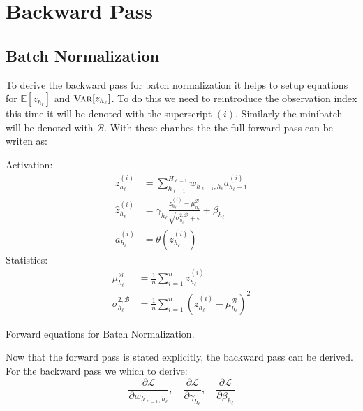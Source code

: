 \chapter{Backward Pass}

\section{Batch Normalization}
\label{appendix:backward-pass:batch-norm}

To derive the backward pass for batch normalization it helps to setup equations for $\mathbb{E}[z_{h_\ell}]$ and $\textsc{Var}[z_{h_\ell}]$. To do this we need to reintroduce the observation index this time it will be denoted with the superscript $(i)$. Similarly the minibatch will be denoted with $\mathcal{B}$. With these chanhes the the full forward pass can be writen as:
\begin{equationbox}[H]
Activation:
\begin{equation*}
\begin{aligned}
z_{h_\ell}^{(i)} &= \sum_{h_{\ell-1}}^{H_{\ell-1}} w_{h_{\ell-1},h_\ell} a_{h_\ell-1}^{(i)} \\
\hat{z}_{h_\ell}^{(i)} &= \gamma_{h_\ell} \frac{z_{h_\ell}^{(i)} - \mu_{h_\ell}^{\mathcal{B}}}{\sqrt{\sigma_{h_\ell}^{2,\mathcal{B}} + \epsilon}} + \beta_{h_\ell} \\
a_{h_\ell}^{(i)} &= \theta\left(z_{h_\ell}^{(i)}\right)
\end{aligned}
\end{equation*}
Statistics:
\begin{equation*}
\begin{aligned}
\mu_{h_\ell}^{\mathcal{B}} &= \frac{1}{n} \sum_{i=1}^n z_{h_\ell}^{(i)} \\
\sigma_{h_\ell}^{2, \mathcal{B}} &= \frac{1}{n} \sum_{i=1}^n (z_{h_\ell}^{(i)} - \mu_{h_\ell}^{\mathcal{B}})^2
\end{aligned}
\end{equation*}
\caption{Forward equations for Batch Normalization.}
\end{equationbox}

Now that the forward pass is stated explicitly, the backward pass can be derived. For the backward pass we which to derive:
\begin{equation}
\frac{\partial \mathcal{L}}{\partial w_{h_{\ell-1},h_\ell}},\quad \frac{\partial \mathcal{L}}{\partial \gamma_{h_\ell}},\quad \frac{\partial \mathcal{L}}{\partial \beta_{h_\ell}}
\end{equation}


